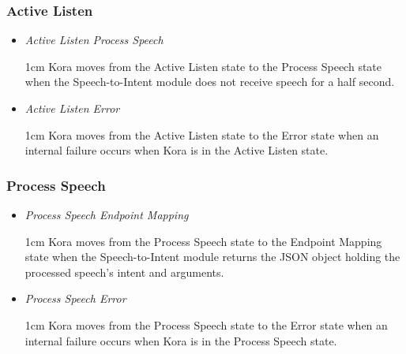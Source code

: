 \documentclass[onecolumn, draftclsnofoot,10pt, compsoc]{IEEEtran}
\def \botname{Kora\xspace}
\newenvironment{indentItem}[1][1cm]{\begin{adjustwidth}{#1}{}}{\end{adjustwidth}}
\begin{document}
		\subsubsection{Active Listen}
		\begin{itemize}
			\item \textit{Active Listen \textrightarrow{}  Process Speech}
			\begin{indentItem}
				\botname moves from the Active Listen state to the Process Speech state when the Speech-to-Intent module does not receive speech for a half second.
			\end{indentItem}
			\item \textit{Active Listen \textrightarrow{}  Error}
			\begin{indentItem}
				\botname moves from the Active Listen state to the Error state when an internal failure occurs when \botname is in the Active Listen state.
			\end{indentItem}
		\end{itemize}
		
		\subsubsection{Process Speech}
		\begin{itemize}
			\item \textit{Process Speech \textrightarrow{} Endpoint Mapping}
			\begin{indentItem}
				\botname moves from the Process Speech state to the Endpoint Mapping state when the Speech-to-Intent module returns the JSON object holding the processed speech's intent and arguments.
			\end{indentItem}
			\item \textit{Process Speech \textrightarrow{} Error}
			\begin{indentItem}
				\botname moves from the Process Speech state to the Error state when an internal failure occurs when \botname is in the Process Speech state.
			\end{indentItem}
		\end{itemize}
		
\end{document}
